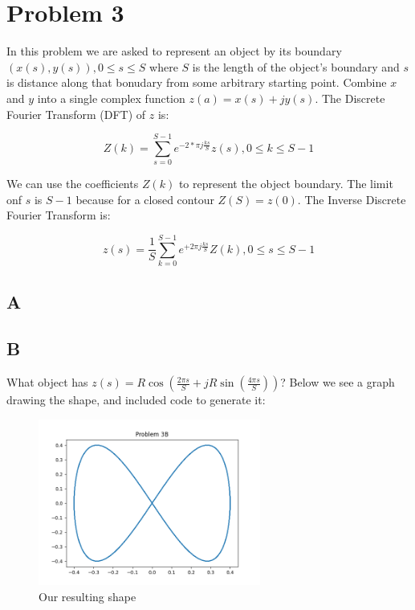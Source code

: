 \documentclass{article}
\begin{document}
\section*{Problem 3}

In this problem we are asked to represent an object by its boundary $(x(s),y(s)),0\leq s\leq S$ where $S$ is the length of the object's boundary and $s$ is distance along that bonudary from some arbitrary starting point. Combine $x$ and $y$ into a single complex function $z(a)=x(s)+jy(s)$. The Discrete Fourier Transform (DFT) of $z$ is:

\begin{equation}
    Z(k) = \sum^{S-1}_{s=0} e^{-2*\pi j \frac{ks}{S}} z(s), 0\leq k \leq S-1
\end{equation}

We can use the coefficients $Z(k)$ to represent the object boundary. The limit onf $s$ is $S-1$ because for a closed contour $Z(S)=z(0)$. The Inverse Discrete Fourier Transform is:

\begin{equation}
    z(s) = \frac{1}{S} \sum_{k=0}^{S-1} e^{+2\pi j \frac{ks}{S}} Z(k), 0 \leq s \leq S-1
\end{equation}

\subsection*{A}

\subsection*{B}

What object has $z(s) = R \cos(\frac{2\pi s}{S} + jR \sin(\frac{4\pi s}{S}))$? Below we see a graph drawing the shape, and included code to generate it:

\begin{figure}[H]
    \centering
    \includegraphics[width = 0.65\textwidth]{imgs/prob3_b.png}
    \caption{Our resulting shape}
    \label{fig:prob3-b}
\end{figure}
\end{document}
